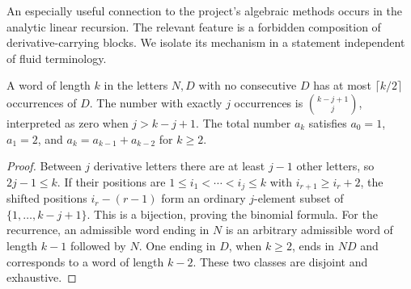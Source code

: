 An especially useful connection to the project's algebraic methods occurs
in the analytic linear recursion. The relevant feature is a forbidden
composition of derivative-carrying blocks. We isolate its mechanism in a
statement independent of fluid terminology.

\begin{lemma}
\label{lem:ns-forbidden-words}
A word of length $k$ in the letters $N,D$ with no consecutive $D$ has at
most $\lceil k/2\rceil$ occurrences of $D$. The number with exactly $j$
occurrences is $\binom{k-j+1}{j}$, interpreted as zero when $j>k-j+1$.
The total number $a_k$ satisfies $a_0=1$, $a_1=2$, and
$a_k=a_{k-1}+a_{k-2}$ for $k\geq2$.
\end{lemma}
\begin{proof}
Between $j$ derivative letters there are at least $j-1$ other letters, so
$2j-1\leq k$. If their positions are
$1\leq i_1<\cdots<i_j\leq k$ with $i_{r+1}\geq i_r+2$, the shifted
positions $i_r-(r-1)$ form an ordinary $j$-element subset of
$\{1,\ldots,k-j+1\}$. This is a bijection, proving the binomial formula.
For the recurrence, an admissible word ending in $N$ is an arbitrary
admissible word of length $k-1$ followed by $N$. One ending in $D$, when
$k\geq2$, ends in $ND$ and corresponds to a word of length $k-2$.
These two classes are disjoint and exhaustive.
\end{proof}

